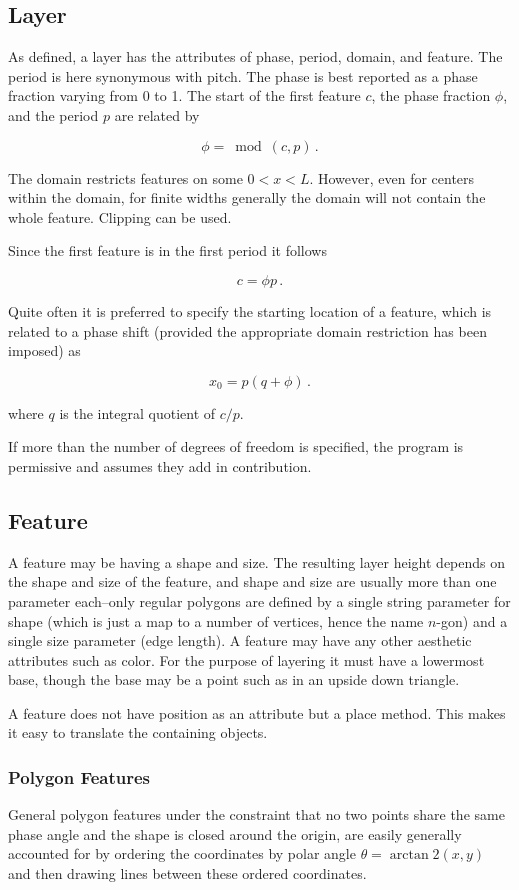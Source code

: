 \documentclass{article}
\begin{document}
\subsection{Layer}

As defined, a layer has the attributes of phase, period, domain, and feature. The period is here synonymous with pitch. The phase is best reported as a phase fraction varying from 0 to 1. The start of the first feature $c$, the phase fraction $\phi$, and the period $p$ are related by

$$ \phi = \bmod(c, p) \,.$$

The domain restricts features on some $0 < x < L$. However, even for centers within the domain, for finite widths generally the domain will not contain the whole feature. Clipping can be used.

Since the first feature is in the first period it follows

$$c = \phi p \,. $$

Quite often it is preferred to specify the starting location of a feature, which is related to a phase shift (provided the appropriate domain restriction has been imposed) as

$$ x_0 = p (q + \phi) \,. $$

where $q$ is the integral quotient of $c/p$.

If more than the number of degrees of freedom is specified, the program is permissive and assumes they add in contribution.

\subsection{Feature}

A feature may be having a shape and size. The resulting layer height depends on the shape and size of the feature, and shape and size are usually more than one parameter each--only regular polygons are defined by a single string parameter for shape (which is just a map to a number of vertices, hence the name $n$-gon) and a single size parameter (edge length). A feature may have any other aesthetic attributes such as color. For the purpose of layering it must have a lowermost base, though the base may be a point such as in an upside down triangle.

A feature does not have position as an attribute but a place method. This makes it easy to translate the containing objects. 

\subsubsection{Polygon Features}
General polygon features under the constraint that no two points share the same phase angle and the shape is closed around the origin, are easily generally accounted for by ordering the coordinates by polar angle $\theta = \arctan2(x,y)$ and then drawing lines between these ordered coordinates.
\end{document}

